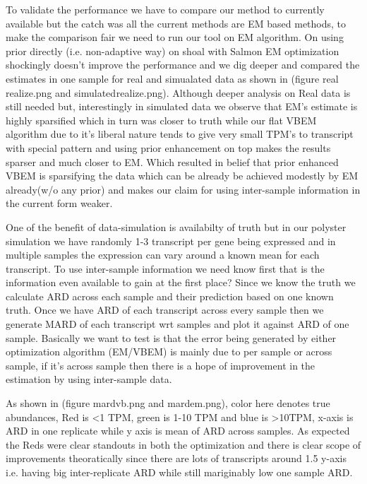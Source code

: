 \documentclass{article}
\begin{document}
To validate the performance we have to compare our method to currently available but the catch was all the current methods are EM based methods, to make the comparison fair we need to run our tool on EM algorithm. On using prior directly (i.e. non-adaptive way) on shoal with Salmon EM optimization shockingly doesn't improve the performance and we dig deeper and compared the estimates in one sample for real and simualated data as shown in (figure real$_{}$realize.png and simulated$_{}$realize.png). Although deeper analysis on Real data is still needed but, interestingly in simulated data we observe that EM's estimate is highly sparsified which in turn was closer to truth while our flat VBEM algorithm due to it's liberal nature tends to give very small TPM's to transcript with special pattern and using prior enhancement on top makes the results sparser and much closer to EM. Which resulted in belief that prior enhanced VBEM is sparsifying the data which can be already be achieved modestly by EM already(w/o any prior) and makes our claim for using inter-sample information in the current form weaker.

One of the benefit of data-simulation is availabilty of truth but in our polyster simulation we have randomly 1-3 transcript per gene being expressed and in multiple samples the expression can vary around a known mean for each transcript. To use inter-sample information we need know first that is the information even available to gain at the first place? Since we know the truth we calculate ARD across each sample and their prediction based on one known truth. Once we have ARD of each transcript across every sample then we generate MARD of each transcript wrt samples and plot it against ARD of one sample. Basically we want to test is that the error being generated by either optimization algorithm (EM/VBEM) is mainly due to per sample or across sample, if it's across sample then there is a hope of improvement in the estimation by using inter-sample data.

As shown in (figure mardvb.png and mardem.png), color here denotes true abundances, Red is <1 TPM, green is 1-10 TPM and blue is >10TPM, x-axis is ARD in one replicate while y axis is mean of ARD across samples. As expected the Reds were clear standouts in both the optimization and there is clear scope of improvements theoratically since there are lots of transcripts around 1.5 y-axis i.e. having big inter-replicate ARD while still mariginably low one sample ARD.



\end{document}

